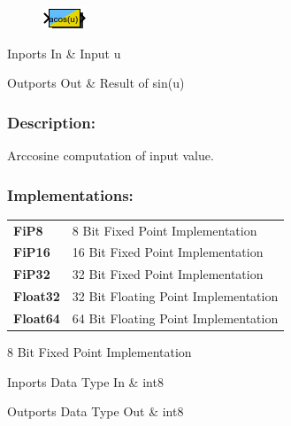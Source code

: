 \label{block:Acos}
\begin{figure}[H]\includegraphics{Acos}\end{figure} 

\begin{XtoCtabular}{Inports}
In & Input u\tabularnewline
\hline
\end{XtoCtabular}


\begin{XtoCtabular}{Outports}
Out & Result of sin(u)\tabularnewline
\hline
\end{XtoCtabular}

\subsubsection*{Description:}
Arccosine computation of input value.


\subsubsection*{Implementations:}
\begin{tabular}{l l}
\textbf{FiP8} & 8 Bit Fixed Point Implementation\tabularnewline
\textbf{FiP16} & 16 Bit Fixed Point Implementation\tabularnewline
\textbf{FiP32} & 32 Bit Fixed Point Implementation\tabularnewline
\textbf{Float32} & 32 Bit Floating Point Implementation\tabularnewline
\textbf{Float64} & 64 Bit Floating Point Implementation\tabularnewline
\end{tabular}

\nopagebreak[0]

8 Bit Fixed Point Implementation

\begin{XtoCtabular}{Inports Data Type}
In & int8\tabularnewline
\hline
\end{XtoCtabular}

\begin{XtoCtabular}{Outports Data Type}
Out & int8\tabularnewline
\hline
\end{XtoCtabular}

\ifdefined \AddTestReports
{}
\fi
{}
\nopagebreak[0]

